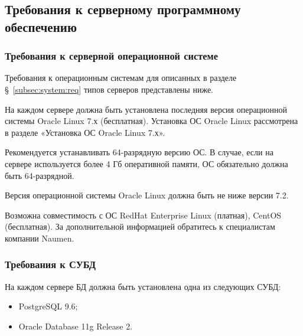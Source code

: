 %
%
%
%
%
%
%
%

\subsection{Требования к серверному программному обеспечению}

\subsubsection{Требования к серверной операционной системе}

Требования к операционным системам для описанных в разделе \S~\ref{subsec:system:req} типов серверов представлены ниже.

На каждом сервере должна быть установлена последняя версия операционной системы Oracle Linux 7.х (бесплатная).
Установка ОС Oracle Linux рассмотрена в разделе «Установка ОС Oracle Linux 7.х». %

Рекомендуется устанавливать 64-разрядную версию ОС.
В случае, если на сервере используется более 4 Гб оперативной памяти, ОС обязательно должна быть 64-разрядной.

Версия операционной системы Oracle Linux должна быть не ниже версии 7.2.

Возможна совместимость с ОС RedHat Enterprise Linux (платная), CentOS (бесплатная).
За дополнительной информацией обратитесь к специалистам компании Naumen.

\subsubsection{Требования к СУБД}

На каждом сервере БД должна быть установлена одна из следующих СУБД:
\begin{itemize}
    \item PostgreSQL 9.6;
    \item Oracle Database 11g Release 2. %
\end{itemize}

